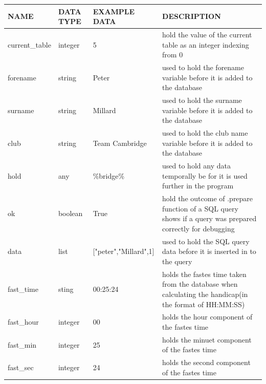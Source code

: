 \begin{longtable}{|l|l|l|p{4cm}|}
	\hline
	NAME           & DATA TYPE & EXAMPLE DATA          & DESCRIPTION                                                                                                \\ \hline
	current\_table & integer   & 5                     & hold the value of the current table as an integer indexing from 0                                          \\ \hline
	forename       & string    & Peter                 & used to hold the forename variable before it is added to the database                                      \\ \hline
	surname        & string    & Millard               & used to hold the surname variable before it is added to the database                                       \\ \hline
	club           & string    & Team Cambridge        & used to hold the club name variable before it is added to the database                                     \\ \hline
	hold           & any       & \%bridge\%            & used to hold any data temporally be for it is used further in the program                                  \\ \hline
	ok             & boolean   & True                  & hold the outcome of .prepare function of a SQL query shows if a query was prepared correctly for debugging \\ \hline
	data           & list      & ["peter","Millard",1] & used to hold the SQL query data before it is inserted in to the query                                      \\ \hline
	fast\_time     & sting     & 00:25:24              & holds the fastes time taken from the database when calculating the handicap(in the format of HH:MM:SS)     \\ \hline
	fast\_hour     & integer   & 00                    & holds the hour component of the fastes time                                                                \\ \hline
	fast\_min      & integer   & 25                    & holds the minuet component of the fastes time                                                              \\ \hline
	fast\_sec      & integer   & 24                    & holds the second component of the fastes time                                                              \\ \hline

\end{longtable}
